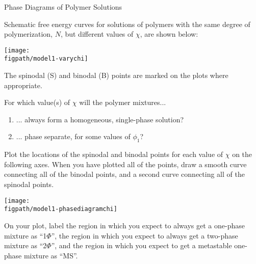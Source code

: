 \begin{activity}{Phase Diagrams of Polymer Solutions}
\begin{instructornotes}
\end{instructornotes}



\begin{model}
\label{\labelbase:mdl:spinodalbinodal}

	Schematic free energy curves for solutions of polymers with the same degree of polymerization, $N$, but different values of $\chi$, are shown below:
	
	\centerline{\texttt{[image: \\figpath/model1-varychi]}}
	
	The spinodal (S) and binodal (B) points are marked on the plots where appropriate.
\end{model}

\begin{ctqs}

	\question For which value(s) of $\chi$ will the polymer mixtures...
	
		\begin{enumerate}
			\item ... always form a homogeneous, single-phase solution?
				
				\begin{solution}[0.75in]
				\end{solution}
			
			\item ... phase separate, for some values of $\phi_1$?
				
				\begin{solution}[0.75in]
				\end{solution}
				
		\end{enumerate}
	
	\question Plot the locations of the spinodal and binodal points for each value of $\chi$ on the following axes.  When you have plotted all of the points, draw a smooth curve connecting all of the binodal points, and a second curve connecting all of the spinodal points.
	
		\centerline{\texttt{[image: \\figpath/model1-phasediagramchi]}}
		
	\question On your plot, label the region in which you expect to always get a one-phase mixture as ``1$\Phi$'', the region in which you expect to always get a two-phase mixture as ``2$\Phi$'', and the region in which you expect to get a metastable one-phase mixture as ``MS''.
		

\end{ctqs}
\end{activity}
